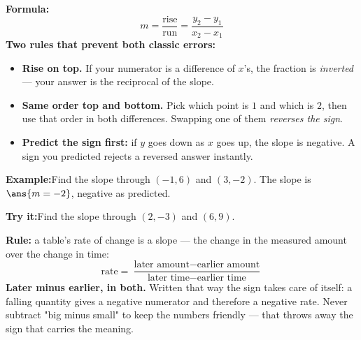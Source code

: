 \documentclass[12pt]{article}
\begin{document}


\begin{formulabox}
\textbf{Formula:}\\[4pt]
\[ m = \frac{\text{rise}}{\text{run}} = \frac{y_2 - y_1}{x_2 - x_1} \]
\textbf{Two rules that prevent both classic errors:}
\begin{itemize}[leftmargin=0.8cm, itemsep=1pt, topsep=2pt]
  \item \textbf{Rise on top.} If your numerator is a difference of $x$'s, the
        fraction is \emph{inverted} --- your answer is the reciprocal of the slope.
  \item \textbf{Same order top and bottom.} Pick which point is $1$ and which is
        $2$, then use that order in both differences. Swapping one of them
        \emph{reverses the sign}.
  \item \textbf{Predict the sign first:} if $y$ goes down as $x$ goes up, the slope
        is negative. A sign you predicted rejects a reversed answer instantly.
\end{itemize}
\end{formulabox}

\begin{examplebox}
\textbf{Example:}\quad Find the slope through $(-1, 6)$ and $(3, -2)$.
The slope is $\ans{m = -2}$, negative as predicted.
\end{examplebox}

\begin{tryitbox}
\textbf{Try it:}\quad Find the slope through $(2, -3)$ and $(6, 9)$.\\[2pt]
\rotatebox{180}{\footnotesize check: $\ans{m = 3}$}
\end{tryitbox}


\begin{formulabox}
\textbf{Rule:} a table's rate of change is a slope --- the change in the measured
amount over the change in time:
\[ \text{rate} = \frac{\text{later amount} - \text{earlier amount}}
                     {\text{later time} - \text{earlier time}} \]
\textbf{Later minus earlier, in both.} Written that way the sign takes care of
itself: a falling quantity gives a negative numerator and therefore a negative
rate. Never subtract "big minus small" to keep the numbers friendly --- that
throws away the sign that carries the meaning.
\end{formulabox}
\end{document}
